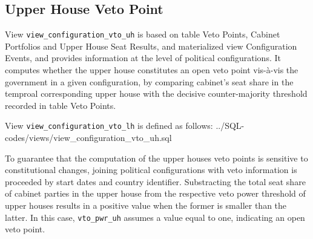 \subsection{Upper House Veto Point}\label{view_configuration_vto_uh}

View \texttt{view\_configuration\_vto\_uh} is based on table Veto Points, Cabinet Portfolios and Upper House Seat Results, and materialized view Configuration Events, and provides information at the level of political configurations.
It computes whether the upper house constitutes an open veto point vis-\`{a}-vis the government in a given configuration, by comparing cabinet's seat share in the temproal corresponding upper house with the decisive counter-majority threshold recorded in table Veto Points. 

View \texttt{view\_configuration\_vto\_lh} is defined as follows:
%
{../SQL-codes/views/view_configuration_vto_uh.sql}


To guarantee that the computation of the upper houses veto points is sensitive to constitutional changes, joining political configurations with veto information is proceeded by start dates and country identifier. 
Substracting the total seat share of cabinet parties in the upper house from the respective veto power threshold of upper houses results in a positive value when the former is smaller than the latter.
In this case, \texttt{vto\_pwr\_uh} assumes a value equal to one, indicating an open veto point.